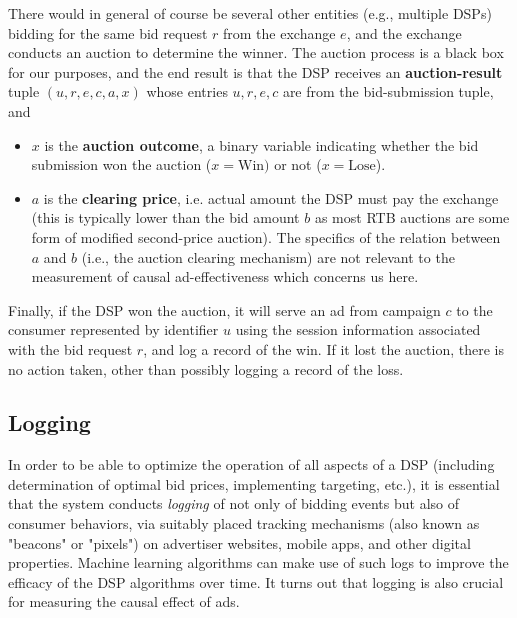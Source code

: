 \documentclass[11pt,a4paper]{article}
\theoremstyle{definition}
\theoremstyle{remark}
\theoremstyle{definition}
\theoremstyle{definition}
\theoremstyle{definition}
\theoremstyle{definition}
\theoremstyle{definition}
\theoremstyle{definition}
\begin{document}
There would in general of course be several other entities (e.g., multiple DSPs) bidding for the same bid request $r$ from the exchange $e$, and the exchange conducts an auction to determine the winner. The auction process is a black box for our purposes, and the end result is that the DSP receives an {\bf auction-result} tuple $(u,r,e,c,a,x)$ whose entries $u,r,e,c$ are from the bid-submission tuple, and 
\begin{itemize}
	\item $x$ is the {\bf auction outcome}, a binary variable indicating whether the bid submission won the auction ($x= \text{Win})$ or not ($x=\text{Lose}$).
	\item $a$ is the {\bf clearing price}, i.e. actual amount the DSP must pay the exchange (this is typically lower than the bid amount $b$ as most RTB auctions are some form of modified second-price auction). The specifics of the relation between $a$ and $b$ (i.e., the auction clearing mechanism) are not relevant to the measurement of causal ad-effectiveness which concerns us here.
\end{itemize}

Finally, if the DSP won the auction, it will serve an ad from campaign $c$ to the consumer represented by identifier $u$ using the session information associated with the bid request $r$, and log a record of the win. If it lost the auction, there is no action taken, other than possibly logging a record of the loss. 


\subsection{Logging}

In order to be able to optimize the operation of all aspects of a DSP (including determination of optimal bid prices, implementing targeting, etc.), it is essential that the system conducts {\em logging} of not only of bidding events but also of consumer behaviors, via suitably placed tracking mechanisms (also known as "beacons" or "pixels") on advertiser websites, mobile apps, and other digital properties. Machine learning algorithms can make use of such logs to improve the efficacy of the DSP algorithms over time. It turns out that logging is also crucial for measuring the causal effect of ads. 
\end{document}
